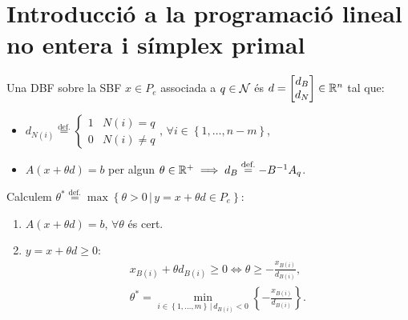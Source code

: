\section{Introducció a la programació lineal no entera i símplex primal}

\begin{defi}
    Una DBF sobre la SBF $x \in P_e$ associada a $q \in \mathcal{N}$ és $d =
    \begin{bmatrix}
        d_B \\
        d_N
    \end{bmatrix}
    \in \mathbb{R}^n$ tal que:
    \begin{itemize}
        \item $d_{N\left(i\right)} \stackrel{\text{def.}}{=}
            \begin{cases}
                1 & N\left(i\right) = q \\
                0 & N\left(i\right) \neq q
            \end{cases}
            ,\, \forall i \in \left\{1, \dots, n-m \right\}$,
        \item $A \left(x + \theta d\right) = b$ per algun $\theta \in \mathbb{R}^+ \implies d_B \stackrel{\text{def.}}{=} -B^{-1} A_q$.
    \end{itemize}
\end{defi}
\begin{prop}
    Calculem $\theta^* \stackrel{\text{def.}}{=} \max \left\{ \theta > 0 \, |\, y = x + \theta d \in P_e\right\}$:
    \begin{enumerate}
        \item $A\left(x + \theta d\right) = b,\, \forall \theta$ és cert.
        \item $y = x + \theta d \geq 0$:
            \begin{gather*}
                x_{B\left(i\right)} + \theta d_{B\left(i\right)} \geq 0 \iff \theta \geq -\frac{x_{B\left(i\right)}}{d_{B\left(i\right)}}, \\
                \theta^* = \min_{i \in \left\{1, \dots, m \right\} \, |\, d_{B\left(i\right)} < 0} \left\{ - \frac{x_{B\left(i\right)}}{d_{B\left(i\right)}} \right\}.
            \end{gather*}
    \end{enumerate}
\end{prop}
